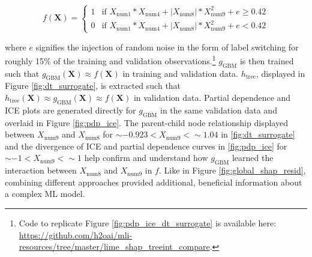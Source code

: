 \documentclass[fleqn]{article}
\newcommand{\twopartdef}[4]
{
	\left\{
		\begin{array}{ll}
			#1 & \mbox{if } #2 \\
			#3 & \mbox{if } #4
		\end{array}
	\right.
}
\begin{document}
\begin{equation}
\label{eq:f}
f(\mathbf{X}) = \twopartdef {1} {X_{\text{num}1} * X_{\text{num}4} + |X_{\text{num}8}| * X_{\text{num}9}^2 + e \geq 0.42} {0} {X_{\text{num}1} * X_{\text{num}4} + |X_{\text{num}8}| * X_{\text{num}9}^2 + e < 0.42}
\end{equation}

\noindent where $e$ signifies the injection of random noise in the form of label switching for roughly 15\% of the training and validation observations.\footnote{Code to replicate Figure \ref{fig:pdp_ice_dt_surrogate} is available here: \url{https://github.com/h2oai/mli-resources/tree/master/lime_shap_treeint_compare}.} $g_{\text{GBM}}$ is then trained such that $g_{\text{GBM}}(\mathbf{X}) \approx f(\mathbf{X})$ in training and validation data. $h_{\text{tree}}$, displayed in Figure \ref{fig:dt_surrogate}, is extracted such that $h_{\text{tree}}(\mathbf{X}) \approx g_{\text{GBM}}(\mathbf{X}) \approx f(\mathbf{X})$ in validation data. Partial dependence and ICE plots are generated directly for $g_{\text{GBM}}$ in the same validation data and overlaid in Figure \ref{fig:pdp_ice}. The parent-child node relationship displayed between $X_{\text{num9}}$ and $X_{\text{num8}}$ for $\sim -0.923 < X_{\text{num9}} <  \sim 1.04$ in \ref{fig:dt_surrogate} and the divergence of ICE and partial dependence curves in \ref{fig:pdp_ice} for $\sim -1 < X_{\text{num9}} <  \sim 1$ help confirm and understand how $g_{\text{GBM}}$ learned the interaction between $X_{\text{num}8}$ and $X_{\text{num}9}$ in $f$. Like in Figure \ref{fig:global_shap_resid}, combining different approaches provided additional, beneficial information about a complex ML model.\\ %

\end{document}

